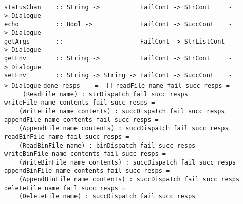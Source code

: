 \mbox{\tt statusChan\ \ \ \ ::\ String\ ->\ \ \ \ \ \ \ \ \ \ \ FailCont\ ->\ StrCont\ \ \ \ \ ->\ Dialogue}\\
\mbox{\tt echo\ \ \ \ \ \ \ \ \ \ ::\ Bool\ ->\ \ \ \ \ \ \ \ \ \ \ \ \ FailCont\ ->\ SuccCont\ \ \ \ ->\ Dialogue}\\
\mbox{\tt getArgs\ \ \ \ \ \ \ ::\ \ \ \ \ \ \ \ \ \ \ \ \ \ \ \ \ \ \ \ \ FailCont\ ->\ StrListCont\ ->\ Dialogue}\\
\mbox{\tt getEnv\ \ \ \ \ \ \ \ ::\ String\ ->\ \ \ \ \ \ \ \ \ \ \ FailCont\ ->\ StrCont\ \ \ \ \ ->\ Dialogue}\\
\mbox{\tt setEnv\ \ \ \ \ \ \ \ ::\ String\ ->\ String\ ->\ FailCont\ ->\ SuccCont\ \ \ \ ->\ Dialogue}
%
%
%
%
%
%
%
%
%
%
%
%
%
%
%
%
%
%
\eprogB\noindent\bprogB
\mbox{\tt done\ resps\ \ \ \ =\ \ []}
\eprogB\noindent\bprogB
\mbox{\tt readFile\ name\ fail\ succ\ resps\ =}\\
\mbox{\tt \ \ \ \ \ (ReadFile\ name)\ :\ strDispatch\ fail\ succ\ resps}
\eprogB\noindent\bprogB
\mbox{\tt writeFile\ name\ contents\ fail\ succ\ resps\ =}\\
\mbox{\tt \ \ \ \ (WriteFile\ name\ contents)\ :\ succDispatch\ fail\ succ\ resps}
\eprogB\noindent\bprogB
\mbox{\tt appendFile\ name\ contents\ fail\ succ\ resps\ =}\\
\mbox{\tt \ \ \ \ (AppendFile\ name\ contents)\ :\ succDispatch\ fail\ succ\ resps}
\eprogB\noindent\bprogB
\mbox{\tt readBinFile\ name\ fail\ succ\ resps\ =}\\
\mbox{\tt \ \ \ \ (ReadBinFile\ name)\ :\ binDispatch\ fail\ succ\ resps}
\eprogB\noindent\bprogB
\mbox{\tt writeBinFile\ name\ contents\ fail\ succ\ resps\ =}\\
\mbox{\tt \ \ \ \ (WriteBinFile\ name\ contents)\ :\ succDispatch\ fail\ succ\ resps}
\eprogB\noindent\bprogB
\mbox{\tt appendBinFile\ name\ contents\ fail\ succ\ resps\ =}\\
\mbox{\tt \ \ \ \ (AppendBinFile\ name\ contents)\ :\ succDispatch\ fail\ succ\ resps}
\eprogB\noindent\bprogB
\mbox{\tt deleteFile\ name\ fail\ succ\ resps\ =}\\
\mbox{\tt \ \ \ \ (DeleteFile\ name)\ :\ succDispatch\ fail\ succ\ resps}
\eprogB\noindent\bprogB
